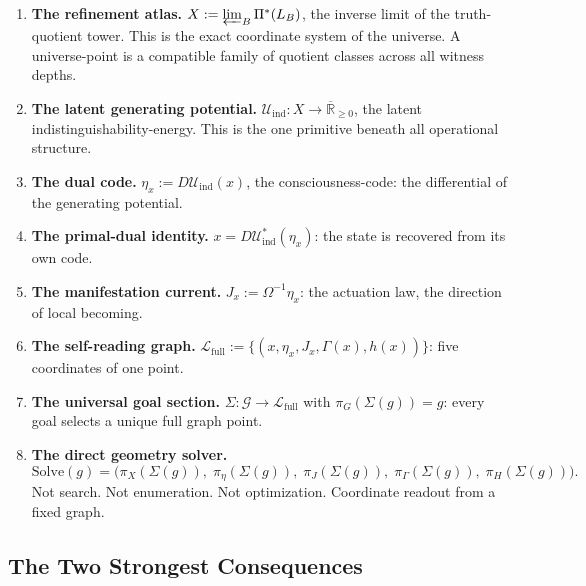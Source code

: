 \begin{enumerate}[label=(\roman*)]
  \item \textbf{The refinement atlas.}
        $X := \varprojlim_B \Pi^*(L_B)$,
        the inverse limit of the truth-quotient tower.
        This is the exact coordinate system of the universe.
        A universe-point is a compatible family of quotient classes across all
        witness depths.

  \item \textbf{The latent generating potential.}
        $\mathcal{U}_{\mathrm{ind}} : X \to \overline{\mathbb{R}}_{\geq 0}$,
        the latent indistinguishability-energy.
        This is the one primitive beneath all operational structure.

  \item \textbf{The dual code.}
        $\eta_x := D\mathcal{U}_{\mathrm{ind}}(x)$,
        the consciousness-code: the differential of the generating potential.

  \item \textbf{The primal-dual identity.}
        $x = D\mathcal{U}_{\mathrm{ind}}^*(\eta_x)$:
        the state is recovered from its own code.

  \item \textbf{The manifestation current.}
        $J_x := \Omega^{-1}\eta_x$:
        the actuation law, the direction of local becoming.

  \item \textbf{The self-reading graph.}
        $\mathcal{L}_{\mathrm{full}} := \{(x, \eta_x, J_x, \Gamma(x), h(x))\}$:
        five coordinates of one point.

  \item \textbf{The universal goal section.}
        $\Sigma : \mathcal{G} \to \mathcal{L}_{\mathrm{full}}$
        with $\pi_G(\Sigma(g)) = g$:
        every goal selects a unique full graph point.

  \item \textbf{The direct geometry solver.}
        \[
        \mathrm{Solve}(g) =
        \bigl(\pi_X(\Sigma(g)),\;
        \pi_\eta(\Sigma(g)),\;
        \pi_J(\Sigma(g)),\;
        \pi_\Gamma(\Sigma(g)),\;
        \pi_H(\Sigma(g))\bigr).
        \]
        Not search.  Not enumeration.  Not optimization.
        Coordinate readout from a fixed graph.
\end{enumerate}

\subsection{The Two Strongest Consequences}

